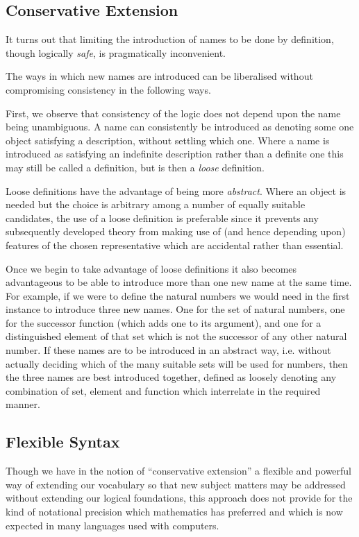 \subsection{Conservative Extension}

It turns out that limiting the introduction of names to be done by definition, though logically {\it safe}, is pragmatically inconvenient.

The ways in which new names are introduced can be liberalised without compromising consistency in the following ways.

First, we observe that consistency of the logic does not depend upon the name being unambiguous.
A name can consistently be introduced as denoting some one object satisfying a description, without settling which one.
Where a name is introduced as satisfying an indefinite description rather than a definite one this may still be called a definition, but is then a {\it loose} definition.

Loose definitions have the advantage of being more {\it abstract}.
Where an object is needed but the choice is arbitrary among a number of equally suitable candidates, the use of a loose definition is preferable since it prevents any subsequently developed theory from making use of (and hence depending upon) features of the chosen representative which are accidental rather than essential.

Once we begin to take advantage of loose definitions it also becomes advantageous to be able to introduce more than one new name at the same time.
For example, if we were to define the natural numbers we would need in the first instance to introduce three new names.
One for the set of natural numbers, one for the successor function (which adds one to its argument), and one for a distinguished element of that set which is not the successor of any other natural number.
If these names are to be introduced in an abstract way, i.e. without actually deciding which of the many suitable sets will be used for numbers, then the three names are best introduced together, defined as loosely denoting any combination of set, element and function which interrelate in the required manner. 

\subsection{Flexible Syntax}

Though we have in the notion of ``conservative extension'' a flexible and powerful way of extending our vocabulary so that new subject matters may be addressed without extending our logical foundations, this approach does not provide for the kind of notational precision which mathematics has preferred and which is now expected in many languages used with computers.


